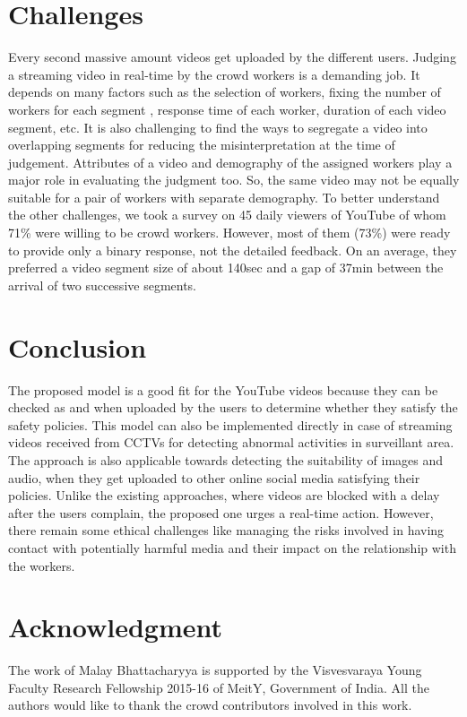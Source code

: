 \documentclass[letterpaper]{article}
\begin{document}
\section{Challenges}
Every second massive amount videos get uploaded by the different users. Judging a streaming video in real-time by the crowd workers is a demanding job. It depends on many factors such as the selection of workers, fixing the number of workers for each segment \cite{carvalho2016}, response time of each worker, duration of each video segment, etc. It is also challenging to find the ways to segregate a video into overlapping segments for reducing the misinterpretation at the time of judgement. Attributes of a video and demography of the assigned workers play a major role in evaluating the judgment too. So, the same video may not be equally suitable for a pair of workers with separate demography. To better understand the other challenges, we took a survey on 45 daily viewers of YouTube of whom 71\% were willing to be crowd workers. However, most of them (73\%) were ready to provide only a binary response, not the detailed feedback. On an average, they preferred a video segment size of about 140sec and a gap of 37min between the arrival of two successive segments.




\section{Conclusion}
The proposed model is a good fit for the YouTube videos because they can be checked as and when uploaded by the users to determine whether they satisfy the safety policies. This model can also be implemented directly in case of streaming videos received from CCTVs for detecting abnormal activities in surveillant area. The approach is also applicable towards detecting the suitability of images and audio, when they get uploaded to other online social media satisfying their policies. Unlike the existing approaches, where videos are blocked with a delay after the users complain, the proposed one urges a real-time action. However, there remain some ethical challenges like managing the risks involved in having contact with potentially harmful media and their impact on the relationship with the workers.




\section{Acknowledgment}
The work of Malay Bhattacharyya is supported by the Visvesvaraya Young Faculty Research Fellowship 2015-16 of MeitY, Government of India. All the authors would like to thank the crowd contributors involved in this work.






\end{document}
